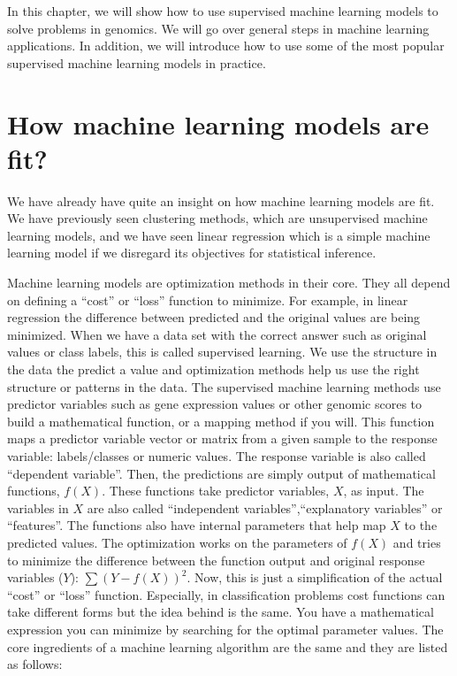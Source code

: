 \documentclass[12pt,]{krantz}
\begin{document}
In this chapter, we will show how to use supervised machine learning models to solve problems in genomics. We will go over general steps in machine learning applications. In addition, we will introduce how to use some of the most popular supervised machine learning models in practice.

\hypertarget{how-machine-learning-models-are-fit}{%
\section{How machine learning models are fit?}\label{how-machine-learning-models-are-fit}}

We have already have quite an insight on how machine learning models are fit. We have previously seen clustering methods, which are unsupervised machine learning models, and we have seen linear regression which is a simple machine learning model if we disregard its objectives for statistical inference.

Machine learning models are optimization methods in their core. They all depend on defining a ``cost'' or ``loss'' function to minimize. For example, in linear regression the difference between predicted and the original values are being minimized. When we have a data set with the correct answer such as original values or class labels, this is called supervised learning. We use the structure in the data the predict a value and optimization methods help us use the right structure or patterns in the data. The supervised machine learning methods use predictor variables such as gene expression values or other genomic scores to build a mathematical function, or a mapping method if you will. This function maps a predictor variable vector or matrix from a given sample to the response variable: labels/classes or numeric values. The response variable is also called ``dependent variable''. Then, the predictions are simply output of mathematical functions, \(f(X)\). These functions take predictor variables, \(X\), as input. The variables in \(X\) are also called ``independent variables'',``explanatory variables'' or ``features''. The functions also have internal parameters that help map \(X\) to the predicted values. The optimization works on the parameters of \(f(X)\) and tries to minimize the difference between the function output and original response variables (\(Y\)): \(\sum(Y-f(X))^2\). Now, this is just a simplification of the actual ``cost'' or ``loss'' function. Especially, in classification problems cost functions can take different forms but the idea behind is the same. You have a mathematical expression you can minimize by searching for the optimal parameter values. The core ingredients of a machine learning algorithm are the same and they are listed as follows:
\end{document}
